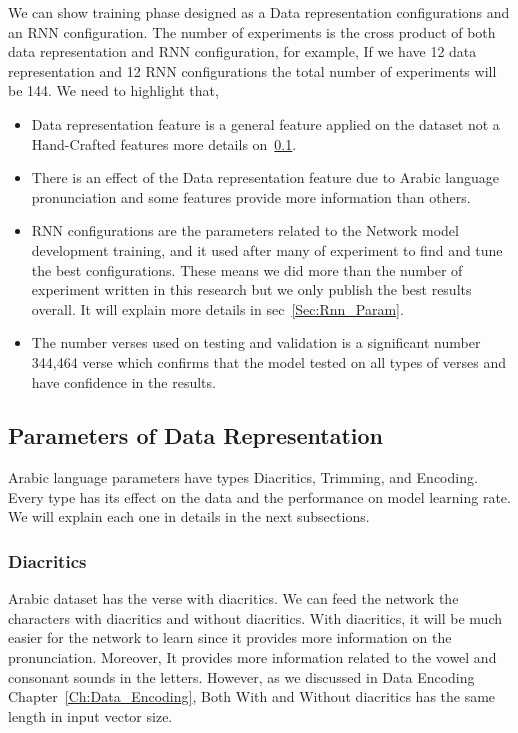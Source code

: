 We can show training phase designed as a Data representation configurations and an RNN configuration. The number of experiments is the cross product of both data representation and RNN configuration, for example, If we have 12 data representation and 12 RNN configurations the total number of experiments will be 144. We need to highlight that,

\begin{itemize}
 \item Data representation feature is a general feature applied on the dataset not a Hand-Crafted features more details on~\ref{Sec:Data_Rep_Param}.
 \item There is an effect of the Data representation feature due to Arabic language pronunciation and some features provide more information than others.
 \item RNN configurations are the parameters related to the Network model development training, and it used after many of experiment to find and tune the best configurations. These means we did more than the number of experiment written in this research but we only publish the best results overall. It will explain more details in sec~\ref{Sec:Rnn_Param}.
 \item The number verses used on testing and validation is a significant number 344,464 verse which confirms that the model tested on all types of verses and have confidence in the results.

\end{itemize}

\subsection{Parameters of Data Representation}\label{Sec:Data_Rep_Param}

Arabic language parameters have types Diacritics, Trimming, and Encoding. Every type has its effect on the data and the performance on model learning rate. We will explain each one in details in the next subsections.

\subsubsection{Diacritics}

Arabic dataset has the verse with diacritics. We can feed the network the characters with diacritics and without diacritics. With diacritics, it will be much easier for the network to learn since it provides more information on the pronunciation. Moreover, It provides more information related to the vowel and consonant sounds in the letters. However, as we discussed in Data Encoding Chapter~\ref{Ch:Data_Encoding}, Both With and Without diacritics has the same length in input vector size.

